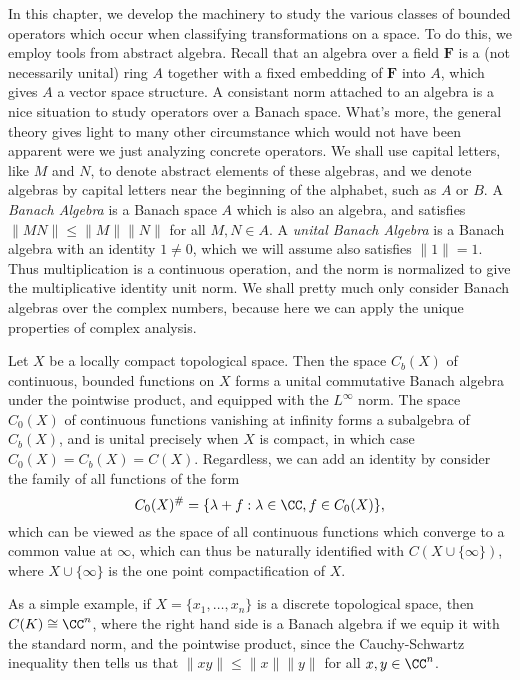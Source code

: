 In this chapter, we develop the machinery to study the various classes of bounded operators which occur when classifying transformations on a space. To do this, we employ tools from abstract algebra. Recall that an algebra over a field $\mathbf{F}$ is a (not necessarily unital) ring $A$ together with a fixed embedding of $\mathbf{F}$ into $A$, which gives $A$ a vector space structure. A consistant norm attached to an algebra is a nice situation to study operators over a Banach space. What's more, the general theory gives light to many other circumstance  which would not have been apparent were we just analyzing concrete operators. We shall use capital letters, like $M$ and $N$, to denote abstract elements of these algebras, and we denote algebras by capital letters near the beginning of the alphabet, such as $A$ or $B$. A \emph{Banach Algebra} is a Banach space $A$ which is also an algebra, and satisfies $\| MN \| \leq \| M \| \| N \|$ for all $M,N \in A$. A \emph{unital Banach Algebra} is a Banach algebra with an identity $1 \neq 0$, which we will assume also satisfies $\| 1 \| = 1$. Thus multiplication is a continuous operation, and the norm is normalized to give the multiplicative identity unit norm. We shall pretty much only consider Banach algebras over the complex numbers, because here we can apply the unique properties of complex analysis.

\begin{example}
    Let $X$ be a locally compact topological space. Then the space $C_b(X)$ of continuous, bounded functions on $X$ forms a unital commutative Banach algebra under the pointwise product, and equipped with the $L^\infty$ norm. The space $C_0(X)$ of continuous functions vanishing at infinity forms a subalgebra of $C_b(X)$, and is unital precisely when $X$ is compact, in which case $C_0(X) = C_b(X) = C(X)$. Regardless, we can add an identity by consider the family of all functions of the form
    \[ C_0(X)^\# = \{ \lambda + f : \lambda \in \CC, f \in C_0(X) \}, \]
    which can be viewed as the space of all continuous functions which converge to a common value at $\infty$, which can thus be naturally identified with $C(X \cup \{ \infty \})$, where $X \cup \{ \infty \}$ is the one point compactification of $X$.

    As a simple example, if $X = \{ x_1, \dots, x_n \}$ is a discrete topological space, then $C(K) \cong \CC^n$, where the right hand side is a Banach algebra if we equip it with the standard norm, and the pointwise product, since the Cauchy-Schwartz inequality then tells us that $\| xy \| \leq \| x \| \| y \|$ for all $x,y \in \CC^n$.
\end{example}


